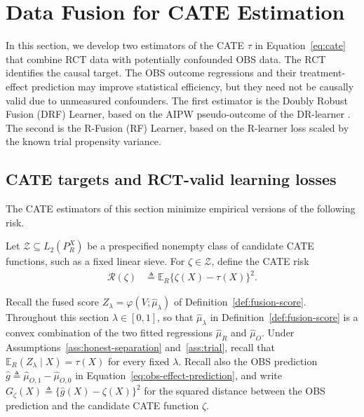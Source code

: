 \section{Data Fusion for CATE Estimation}
\label{sec:cate}

In this section, we develop two estimators of the CATE $\tau$ in Equation~\eqref{eq:cate} that combine  RCT data with  potentially confounded OBS data. The RCT identifies the causal target. The OBS outcome regressions and their treatment-effect prediction may improve statistical efficiency, but they need not be causally valid due to unmeasured confounders. The first estimator is the Doubly Robust Fusion (DRF) Learner, based on the AIPW pseudo-outcome of the DR-learner \citep{kennedy2022drlearner}. The second is the R-Fusion (RF) Learner, based on the R-learner loss \citep{nie2020rlearner} scaled by the known trial propensity variance.


\subsection{CATE targets and RCT-valid learning losses}
\label{sec:cate-loss}


The CATE estimators of this section minimize empirical versions of the following risk.
\begin{definition}
\label{def:cate-class-risk}
Let $\mathcal Z\subseteq L_2(P_R^X)$ be a prespecified nonempty class of candidate CATE functions, such as a fixed linear sieve. For $\zeta\in\mathcal Z$, define the CATE risk
\begin{align}
\mathcal R(\zeta)&\triangleq\mathbb E_R\{\zeta(X)-\tau(X)\}^2.
\label{eq:cate-ideal-risk}
\end{align}
\end{definition}

Recall the fused score $Z_\lambda=\varphi(V;\widehat\mu_\lambda)$ of Definition~\ref{def:fusion-score}. Throughout this section $\lambda\in[0,1]$, so that $\widehat\mu_\lambda$ in Definition~\ref{def:fusion-score} is a convex combination of the two fitted regressions $\widehat\mu_R$ and $\widehat\mu_O$. Under Assumptions~\ref{ass:honest-separation} and~\ref{ass:trial}, recall that $\mathbb E_R(Z_\lambda\mid X)=\tau(X)$ for every fixed $\lambda$. Recall also the OBS prediction $\widehat g\triangleq\widehat\mu_{O,1}-\widehat\mu_{O,0}$ in Equation~\eqref{eq:obs-effect-prediction}, and write $G_\zeta(X)\triangleq\{\widehat g(X)-\zeta(X)\}^2$ for the squared distance between the OBS prediction and the candidate CATE function $\zeta$.

